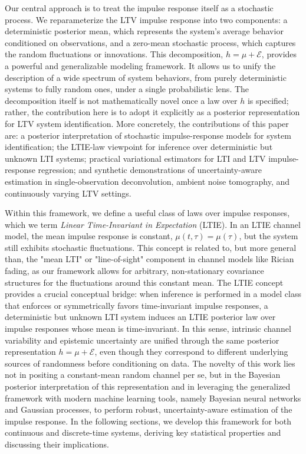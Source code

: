 \documentclass[preprint,1p,times,authoryear]{elsarticle}
\begin{document}
Our central approach is to treat the impulse response itself as a stochastic process. We reparameterize the LTV impulse response into two components: a deterministic posterior mean, which represents the system's average behavior conditioned on observations, and a zero-mean stochastic process, which captures the random fluctuations or innovations. This decomposition, $h = \mu + \mathcal{E}$, provides a powerful and generalizable modeling framework. It allows us to unify the description of a wide spectrum of system behaviors, from purely deterministic systems to fully random ones, under a single probabilistic lens. The decomposition itself is not mathematically novel once a law over $h$ is specified; rather, the contribution here is to adopt it explicitly as a posterior representation for LTV system identification. More concretely, the contributions of this paper are: a posterior interpretation of stochastic impulse-response models for system identification; the LTIE-law viewpoint for inference over deterministic but unknown LTI systems; practical variational estimators for LTI and LTV impulse-response regression; and synthetic demonstrations of uncertainty-aware estimation in single-observation deconvolution, ambient noise tomography, and continuously varying LTV settings.

Within this framework, we define a useful class of laws over impulse responses, which we term \emph{Linear Time-Invariant in Expectation} (LTIE).  In an LTIE channel model, the mean impulse response is constant, $\mu(t, \tau) = \mu(\tau)$, but the system still exhibits stochastic fluctuations. This concept is related to, but more general than, the "mean LTI" or "line-of-sight" component in channel models like Rician fading, as our framework allows for arbitrary, non-stationary covariance structures for the fluctuations around this constant mean. The LTIE concept provides a crucial conceptual bridge: when inference is performed in a model class that enforces or symmetrically favors time-invariant impulse responses, a deterministic but unknown LTI system induces an LTIE posterior law over impulse responses whose mean is time-invariant. In this sense, intrinsic channel variability and epistemic uncertainty are unified through the same posterior representation $h=\mu+\mathcal{E}$, even though they correspond to different underlying sources of randomness before conditioning on data. The novelty of this work lies not in positing a constant-mean random channel per se, but in the Bayesian posterior interpretation of this representation and in leveraging the generalized framework with modern machine learning tools, namely Bayesian neural networks and Gaussian processes, to perform robust, uncertainty-aware estimation of the impulse response. In the following sections, we develop this framework for both continuous and discrete-time systems, deriving key statistical properties and discussing their implications.
\end{document}
